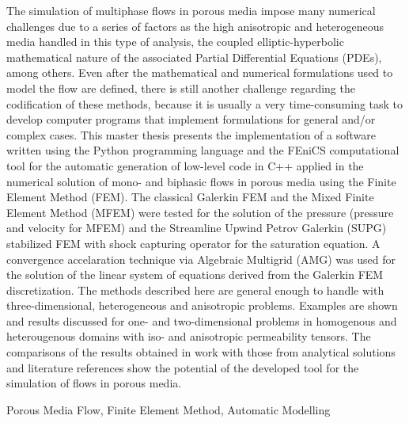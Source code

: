 The simulation of multiphase flows in porous media impose many numerical challenges due to a series of factors as the high anisotropic and heterogeneous media handled in this type of analysis, the coupled elliptic-hyperbolic mathematical nature of the associated Partial Differential Equations (PDEs),  among others. Even after the mathematical and numerical formulations used to model the flow are defined, there is still another challenge regarding the codification of these methods, because it is usually a very time-consuming task to develop computer programs that implement formulations for general and/or complex cases. This master thesis presents the implementation of a software written using the Python programming language and the FEniCS computational tool for the automatic generation of low-level code in C++ applied in the numerical solution of mono- and biphasic flows in porous media using the Finite Element Method (FEM). The classical Galerkin FEM and the Mixed Finite Element Method (MFEM) were tested for the solution of the pressure (pressure and velocity for MFEM) and the Streamline Upwind Petrov Galerkin (SUPG) stabilized FEM with shock capturing operator for the saturation equation. A convergence accelaration technique via Algebraic Multigrid (AMG) was used for the solution of the linear system of equations derived from the Galerkin FEM discretization. The methods described here are general enough to handle with three-dimensional, heterogeneous and anisotropic problems. Examples are shown and results discussed for one- and two-dimensional problems in homogenous and heterougenous domains with iso- and anisotropic permeability tensors. The comparisons of the results obtained in work with those from analytical solutions and literature references show the potential of the developed tool for the simulation of flows in porous media.

\begin{keywords}
Porous Media Flow, Finite Element Method, Automatic Modelling
\end{keywords}
